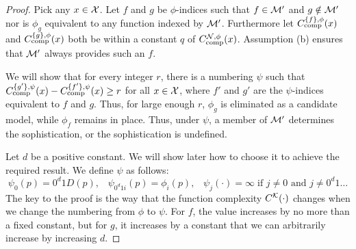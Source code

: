 \begin{proof}\enlargethispage{2\baselineskip}
Pick any $x \in {\cal X}$. Let $f$ and $g$ be $\phi$-indices such that $f \in {\cal M}'$ and $g \notin {\cal M}'$ nor is $\phi_g$ equivalent to any function indexed by ${\cal M}'$. Furthermore let $C_{\textnormal{comp}}^{\{f\}, \phi}(x)$ and $C_{\textnormal{comp}}^{\{g\}, \phi}(x)$ both be within a constant $q$ of $C_{\textnormal{comp}}^{{\cal N},\phi}(x)$. Assumption (b) ensures that ${\cal M}'$ always provides such an $f$. 

We will show that for every integer $r$, there is a numbering $\psi$ such that $C_{\textnormal{comp}}^{\{g'\}, \psi}(x) - C_{\textnormal{comp}}^{\{f'\}, \psi}(x) \geq r$ for all $x \in {\cal X}$, where $f'$ and $g'$ are the $\psi$-indices equivalent to $f$ and $g$. Thus, for large enough $r$, $\phi_g$ is eliminated as a candidate model, while $\phi_f$ remains in place. Thus, under $\psi$, a member of ${\cal M}'$ determines the sophistication, or the sophistication is undefined.

Let $d$ be a positive constant. We will show later how to choose it to achieve the required result. We define $\psi$ as follows:
\[
\psi_0(p) = 0^d 1 D(p), \;\;\;
\psi_{0^d1i}(p) = \phi_i(p), \;\;\;
\psi_j(\cdot) = \infty \;\text{if $j\neq 0$ and $j \neq 0^d1\ldots$}
\]
The key to the proof is the way that the function complexity $C^{\cal K}(\cdot)$ changes when we change the numbering from $\phi$ to $\psi$. For $f$, the value increases by no more than a fixed constant, but for $g$, it increases by a constant that we can arbitrarily increase by increasing $d$.


\end{proof}
